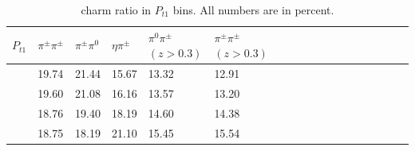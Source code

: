 \begin{table}[H]\footnotesize
\centering
\begin{tabular}{|l|l|l|l|l|l|l|l|l|l|l|l|l|l|l|l|l|l|}
\hline
$P_{t1}$  &$\pi^{\pm}\pi^{\pm}$ & $\pi^{\pm}\pi^0$ & $\eta\pi^{\pm}$ & $\pi^0\pi^{\pm}$ $(z>0.3)$ & $\pi^{\pm}\pi^{\pm}$ $(z>0.3)$ \\ \hline
[0,0.15]	&	19.74	&	21.44	&	15.67	&	13.32	&	12.91	\\ \hline
[0.15,0.30]	&	19.60	&	21.08	&	16.16	&	13.57	&	13.20	\\ \hline
[0.30,0.50]	&	18.76	&	19.40	&	18.19	&	14.60	&	14.38	\\ \hline
[0.50,3.0]	&	18.75	&	18.19	&	21.10	&	15.45	&	15.54	\\ \hline
\end{tabular}
\caption{charm ratio in $P_{t1}$ bins. All numbers are in percent.}
\label{tab:sinptcharmratio}
\end{table}

